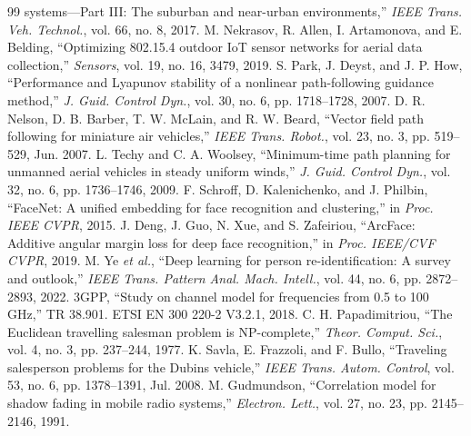 \begin{thebibliography}{99}
systems---Part III: The suburban and near-urban environments,'' \emph{IEEE Trans. Veh. Technol.}, vol. 66, no. 8, 2017.
 M. Nekrasov, R. Allen, I. Artamonova, and E. Belding, ``Optimizing 802.15.4 outdoor IoT sensor
networks for aerial data collection,'' \emph{Sensors}, vol. 19, no. 16, 3479, 2019.
 S. Park, J. Deyst, and J. P. How, ``Performance and Lyapunov stability of a nonlinear path-following
guidance method,'' \emph{J. Guid. Control Dyn.}, vol. 30, no. 6, pp. 1718--1728, 2007.
 D. R. Nelson, D. B. Barber, T. W. McLain, and R. W. Beard, ``Vector field path following for
miniature air vehicles,'' \emph{IEEE Trans. Robot.}, vol. 23, no. 3, pp. 519--529, Jun. 2007.
 L. Techy and C. A. Woolsey, ``Minimum-time path planning for unmanned aerial vehicles in steady
uniform winds,'' \emph{J. Guid. Control Dyn.}, vol. 32, no. 6, pp. 1736--1746, 2009.
 F. Schroff, D. Kalenichenko, and J. Philbin, ``FaceNet: A unified embedding for face recognition
and clustering,'' in \emph{Proc. IEEE CVPR}, 2015.
 J. Deng, J. Guo, N. Xue, and S. Zafeiriou, ``ArcFace: Additive angular margin loss for deep face
recognition,'' in \emph{Proc. IEEE/CVF CVPR}, 2019.
 M. Ye \emph{et al.}, ``Deep learning for person re-identification: A survey and outlook,'' \emph{IEEE
Trans. Pattern Anal. Mach. Intell.}, vol. 44, no. 6, pp. 2872--2893, 2022.
 3GPP, ``Study on channel model for frequencies from 0.5 to 100 GHz,'' TR 38.901.
 ETSI EN 300 220-2 V3.2.1, 2018.
 C. H. Papadimitriou, ``The Euclidean travelling salesman problem is NP-complete,''
\emph{Theor. Comput. Sci.}, vol. 4, no. 3, pp. 237--244, 1977.
 K. Savla, E. Frazzoli, and F. Bullo, ``Traveling salesperson problems for the Dubins vehicle,''
\emph{IEEE Trans. Autom. Control}, vol. 53, no. 6, pp. 1378--1391, Jul. 2008.
 M. Gudmundson, ``Correlation model for shadow fading in mobile radio systems,'' \emph{Electron.
Lett.}, vol. 27, no. 23, pp. 2145--2146, 1991.
\end{thebibliography}
